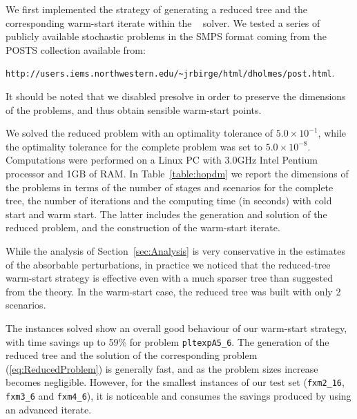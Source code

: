 We first implemented the strategy of generating a reduced tree and 
the corresponding warm-start iterate within the \HOPDM\ \cite{Gondzio96} 
solver. We tested a series of publicly available stochastic problems in 
the SMPS format \cite{SMPS} coming from the POSTS collection 
available from:
\begin{center}
{\tt http://users.iems.northwestern.edu/\~{}jrbirge/html/dholmes/post.html}.
\end{center}
%
%
It should be noted that we disabled presolve %
in order to preserve the dimensions of the problems, and thus obtain 
sensible warm-start points.

We solved the reduced problem with an optimality tolerance of 
$5.0\times 10^{-1}$, while the optimality tolerance for the complete 
problem was set to $5.0\times 10^{-8}$. 
Computations were performed on a Linux PC with 3.0GHz Intel Pentium 
processor and 1GB of RAM.
In Table~\ref{table:hopdm} we report the dimensions of the problems 
in terms of the number of stages and scenarios for the complete 
tree, the number of iterations and the computing time (in seconds) 
with cold start and warm start. The latter includes the generation 
and solution of the reduced problem, and the construction of the 
warm-start iterate.

While the analysis of Section~\ref{sec:Analysis} is very conservative
in the estimates of the absorbable perturbations, in practice we noticed
that the reduced-tree warm-start strategy is effective even with
a much sparser tree than suggested from the theory.
In the warm-start case, the reduced tree was built with only 2 scenarios.

The instances solved show an overall good behaviour of our warm-start
strategy, with time savings up to 59\% for problem {\tt pltexpA5\_6}.
The generation of the reduced tree and the solution of the corresponding
problem (\ref{eq:ReducedProblem}) is generally fast, and as the problem 
sizes increase becomes negligible. However, for the smallest instances
of our test set ({\tt fxm2\_16}, {\tt fxm3\_6} and {\tt fxm4\_6}), it
is noticeable and consumes the savings produced by using an advanced
iterate.

